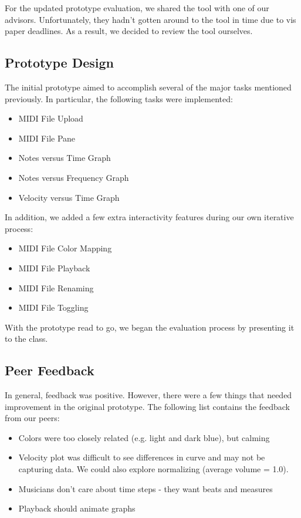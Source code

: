 \documentclass[journal]{vgtc}                %
\begin{document}
For the updated prototype evaluation, we shared the tool with one of our advisors.
Unfortunately, they hadn’t gotten around to the tool in time due to vis paper
deadlines. As a result, we decided to review the tool ourselves.

\subsection{Prototype Design}

The initial prototype aimed to accomplish several of the major tasks mentioned
previously. In particular, the following tasks were implemented:

\begin{itemize}
  \item MIDI File Upload
  \item MIDI File Pane
  \item Notes versus Time Graph
  \item Notes versus Frequency Graph
  \item Velocity versus Time Graph
\end{itemize}

In addition, we added a few extra interactivity features during our own
iterative process:

\begin{itemize}
  \item MIDI File Color Mapping
  \item MIDI File Playback
  \item MIDI File Renaming
  \item MIDI File Toggling
\end{itemize}

With the prototype read to go, we began the evaluation process by presenting
it to the class.

\subsection{Peer Feedback}

In general, feedback was positive. However, there were a few things
that needed improvement in the original prototype. The following
list contains the feedback from our peers:

\begin{itemize}
  \item Colors were too closely related (e.g. light and dark blue), but calming
  \item Velocity plot was difficult to see differences in curve and may not be capturing data.
  We could also explore normalizing (average volume = 1.0).
  \item Musicians don't care about time steps - they want beats and measures
  \item Playback should animate graphs
\end{itemize}
\end{document}
